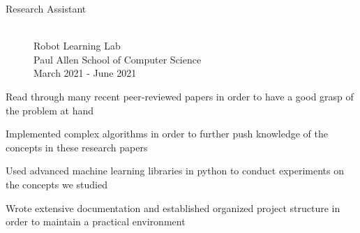 \documentclass[10pt]{article}
\newenvironment{itemize*}
{\begin{itemize}[leftmargin=*]
    \setlength{\parskip}{0.5pt}}
{\end{itemize}}
\begin{document}
\begin{paracol}{2}
\begin{description}
\item[Research Assistant] \hfill \\
    Robot Learning Lab \\
    Paul Allen School of Computer Science \\
    March 2021 - June 2021
\end{description}
\begin{itemize*}
\item Read through many recent peer-reviewed papers in order to have a good
      grasp of the problem at hand
\item Implemented complex algorithms in order to further push knowledge of the
      concepts in these research papers
\item Used advanced machine learning libraries in python to conduct experiments
      on the concepts we studied
\item Wrote extensive documentation and established organized project structure
      in order to maintain a practical environment
\end{itemize*}
\end{paracol}
\end{document}
